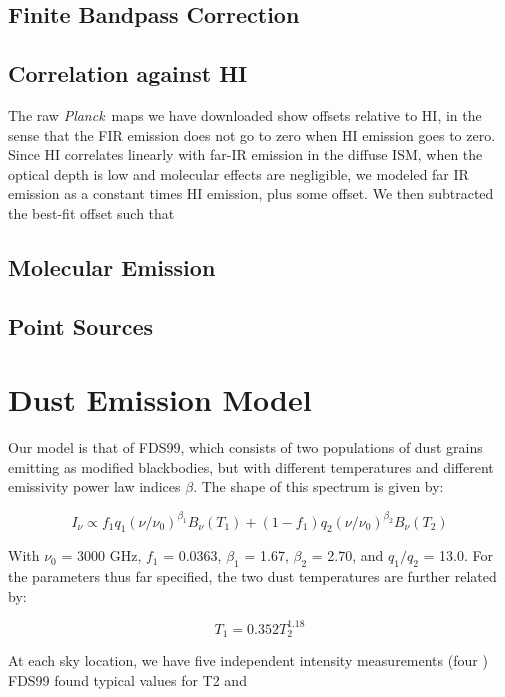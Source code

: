 \documentclass{emulateapj}
\newcommand{\PLANCK}{{\it Planck}}
\begin{document}
\subsection{Finite Bandpass Correction}


\subsection{Correlation against HI}
The raw \PLANCK~maps we have downloaded show offsets relative to HI, in the
sense that the FIR emission does not go to zero when HI emission goes to
zero. Since HI correlates linearly with far-IR emission in the diffuse ISM, 
when the optical depth is low and molecular effects are negligible, we modeled
far IR emission as a constant times HI emission, plus some offset. We then
subtracted the best-fit offset such that 

\subsection{Molecular Emission}

\subsection{Point Sources}

\section{Dust Emission Model}
Our model is that of FDS99, which consists of two populations of dust 
grains emitting as modified blackbodies, but with different temperatures
and different emissivity power law indices $\beta$. The shape of this spectrum 
is given by:

\begin{equation}
I_{\nu} \propto f_{1}q_{1}(\nu/\nu_{0})^{\beta_1}B_{\nu}(T_1) + (1-f_{1})q_{2}(\nu/\nu_0)^{\beta_2}B_{\nu}(T_2)
\end{equation}

With $\nu_0$ = 3000 GHz, $f_{1}$ = 0.0363, $\beta_1$ = 1.67, $\beta_2$ = 2.70, 
and $q_1/q_2$ = 13.0. For the parameters thus far specified, the two dust temperatures are further related by:

\begin{equation}
T_1 = 0.352T_2^{1.18}
\end{equation}

At each sky location, we have five independent intensity 
measurements (four ) FDS99 found typical values for T2 and 
\end{document}

